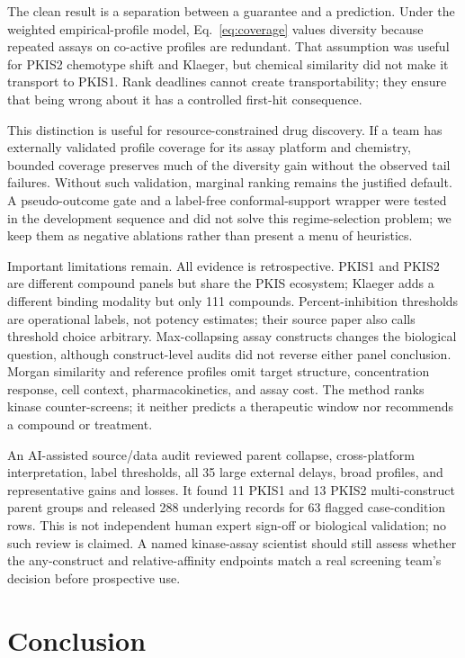 \documentclass{article}
\begin{document}
The clean result is a separation between a guarantee and a prediction. Under
the weighted empirical-profile model, Eq.~\ref{eq:coverage} values diversity
because repeated assays on co-active profiles are redundant. That assumption
was useful for PKIS2 chemotype shift and Klaeger, but chemical similarity did
not make it transport to PKIS1. Rank deadlines cannot create transportability;
they ensure that being wrong about it has a controlled first-hit consequence.

This distinction is useful for resource-constrained drug discovery. If a team
has externally validated profile coverage for its assay platform and chemistry,
bounded coverage preserves much of the diversity gain without the observed
tail failures. Without such validation, marginal ranking remains the justified
default. A pseudo-outcome gate and a label-free conformal-support wrapper were
tested in the development sequence and did not solve this regime-selection
problem; we keep them as negative ablations rather than present a menu of
heuristics.

Important limitations remain. All evidence is retrospective. PKIS1 and PKIS2
are different compound panels but share the PKIS ecosystem; Klaeger adds a
different binding modality but only 111 compounds. Percent-inhibition
thresholds are operational labels, not potency estimates; their source paper
also calls threshold choice arbitrary. Max-collapsing assay constructs changes
the biological question, although construct-level audits did not reverse either
panel conclusion. Morgan similarity and reference profiles
omit target structure, concentration response, cell context, pharmacokinetics,
and assay cost. The method ranks kinase counter-screens; it neither predicts a
therapeutic window nor recommends a compound or treatment.

An AI-assisted source/data audit reviewed parent collapse, cross-platform
interpretation, label thresholds, all 35 large external delays, broad profiles,
and representative gains and losses. It found 11 PKIS1 and 13 PKIS2
multi-construct parent groups and released 288 underlying records for 63
flagged case-condition rows. This is not independent human expert sign-off or
biological validation; no such review is claimed. A named kinase-assay scientist
should still assess whether the any-construct and relative-affinity endpoints
match a real screening team's decision before prospective use.

\section{Conclusion}
\end{document}
